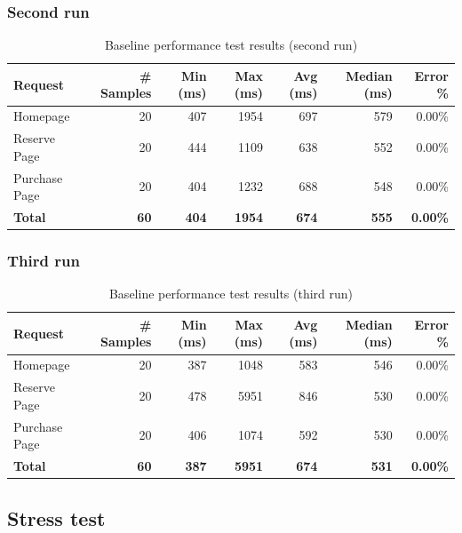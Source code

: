 \documentclass[11pt, leqno, oneside]{article}
\begin{document}
\subsubsection{Second run}

\begin{table}[H]
\centering
\small
\begin{tabularx}{\textwidth}{X r r r r r r}
  \hline
  \textbf{Request} & \textbf{\# Samples} & \textbf{Min (ms)} & \textbf{Max (ms)} & \textbf{Avg (ms)} & \textbf{Median (ms)} & \textbf{Error \%} \\
  \hline
  Homepage      & 20 & 407 & 1954 & 697 & 579 & 0.00\% \\
  Reserve Page  & 20 & 444 & 1109 & 638 & 552 & 0.00\% \\
  Purchase Page & 20 & 404 & 1232 & 688 & 548 & 0.00\% \\
  \hline
  \textbf{Total} & \textbf{60} & \textbf{404} & \textbf{1954} & \textbf{674} & \textbf{555} & \textbf{0.00\%} \\
  \hline
\end{tabularx}
\caption{Baseline performance test results (second run)}
\label{tab:performance2}
\end{table}

\subsubsection{Third run}

\begin{table}[H]
\centering
\small
\begin{tabularx}{\textwidth}{X r r r r r r}
  \hline
  \textbf{Request} & \textbf{\# Samples} & \textbf{Min (ms)} & \textbf{Max (ms)} & \textbf{Avg (ms)} & \textbf{Median (ms)} & \textbf{Error \%} \\
  \hline
  Homepage      & 20 & 387 & 1048 & 583 & 546 & 0.00\% \\
  Reserve Page  & 20 & 478 & 5951 & 846 & 530 & 0.00\% \\
  Purchase Page & 20 & 406 & 1074 & 592 & 530 & 0.00\% \\
  \hline
  \textbf{Total} & \textbf{60} & \textbf{387} & \textbf{5951} & \textbf{674} & \textbf{531} & \textbf{0.00\%} \\
  \hline
\end{tabularx}
\caption{Baseline performance test results (third run)}
\label{tab:performance3}
\end{table}

\subsection{Stress test}
\end{document}
